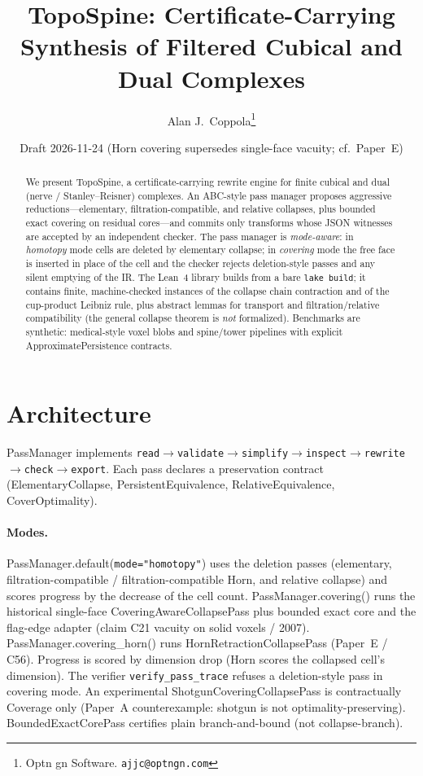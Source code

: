 \documentclass[11pt]{article}
\title{TopoSpine: Certificate-Carrying Synthesis of Filtered Cubical and Dual Complexes}
\author{Alan J.\ Coppola\thanks{Optn gn Software. \texttt{ajjc@optngn.com}}}
\date{Draft 2026-11-24 (Horn covering supersedes single-face vacuity; cf.\ Paper~E)}
\begin{document}
\maketitle

\begin{abstract}
We present \textsf{TopoSpine}, a certificate-carrying rewrite engine for finite
cubical and dual (nerve / Stanley--Reisner) complexes.  An ABC-style pass
manager proposes aggressive reductions---elementary, filtration-compatible,
and relative collapses, plus bounded exact covering on residual cores---and
commits only transforms whose JSON witnesses are accepted by an independent
checker.  The pass manager is \emph{mode-aware}: in \emph{homotopy} mode cells are
deleted by elementary collapse; in \emph{covering} mode the free face is inserted in
place of the cell and the checker rejects deletion-style passes and any silent emptying
of the IR.  The Lean~4 library builds from a bare \texttt{lake build}; it contains
finite, machine-checked instances of the collapse chain contraction and of the
cup-product Leibniz rule, plus abstract lemmas for transport and filtration/relative
compatibility (the general collapse theorem is \emph{not} formalized).  Benchmarks are
synthetic: medical-style voxel blobs and spine/tower pipelines with explicit
\textsf{ApproximatePersistence} contracts.
\end{abstract}

\section{Architecture}
\textsf{PassManager} implements
\texttt{read$\to$validate$\to$simplify$\to$inspect$\to$rewrite$\to$check$\to$export}.
Each pass declares a preservation contract
(\textsf{ElementaryCollapse}, \textsf{PersistentEquivalence},
\textsf{RelativeEquivalence}, \textsf{CoverOptimality}).

\paragraph{Modes.}
\textsf{PassManager.default}(\texttt{mode="homotopy"}) uses the deletion passes
(elementary, filtration-compatible / filtration-compatible Horn, and relative collapse)
and scores progress by the decrease of the cell count.
\textsf{PassManager.covering}() runs the historical single-face
\textsf{CoveringAwareCollapsePass} plus bounded exact core and the flag-edge adapter
(claim C21 vacuity on solid voxels / 2007).  \textsf{PassManager.covering\_horn}()
runs \textsf{HornRetractionCollapsePass} (Paper~E / C56).  Progress is scored by
dimension drop (Horn scores the collapsed cell's dimension).  The verifier
\texttt{verify\_pass\_trace} refuses a deletion-style pass in covering mode.
An experimental \textsf{ShotgunCoveringCollapsePass} is contractually
\textsf{Coverage} only (Paper~A counterexample: shotgun is not optimality-preserving).
\textsf{BoundedExactCorePass} certifies plain branch-and-bound (not collapse-branch).
\end{document}
